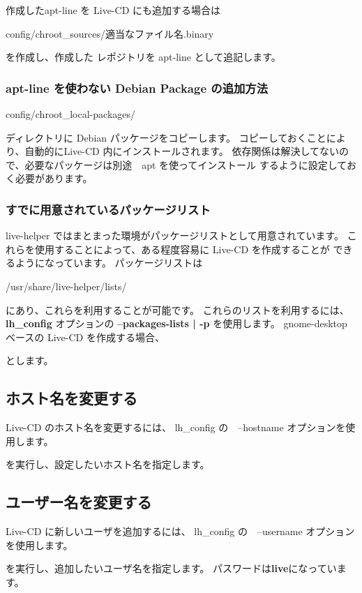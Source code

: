 \documentclass[mingoth,a4paper]{jsarticle}
\begin{document}
作成したapt-line を Live-CD にも追加する場合は
\begin{commandline}
config/chroot_sources/適当なファイル名.binary
\end{commandline}
を作成し、作成した レポジトリを apt-line として追記します。

\subsubsection{apt-line を使わない Debian Package の追加方法}
\begin{commandline}
config/chroot_local-packages/
\end{commandline}
ディレクトリに Debian パッケージをコピーします。
コピーしておくことにより、自動的にLive-CD 内にインストールされます。
依存関係は解決してないので、必要なパッケージは別途　apt を使ってインストール
するように設定しておく必要があります。

\subsubsection{すでに用意されているパッケージリスト}
live-helper ではまとまった環境がパッケージリストとして用意されています。
これらを使用することによって、ある程度容易に Live-CD を作成することが
できるようになっています。
パッケージリストは
\begin{commandline}
/usr/share/live-helper/lists/
\end{commandline}
にあり、これらを利用することが可能です。
これらのリストを利用するには、{\bf lh\_config} オプションの {\bf --packages-lists | -p} 
を使用します。
gnome-desktop ベースの Live-CD を作成する場合、
\begin{commandline}
\end{commandline}
とします。

\subsection{ホスト名を変更する}
Live-CD のホスト名を変更するには、
lh\_config の　--hostname オプションを使用します。
\begin{commandline}
\end{commandline}
を実行し、設定したいホスト名を指定します。

\subsection{ユーザー名を変更する}
Live-CD に新しいユーザを追加するには、
lh\_config の　--username オプションを使用します。
\begin{commandline}
\end{commandline}
を実行し、追加したいユーザ名を指定します。
パスワードは{\bf live}になっています。
\end{document}
